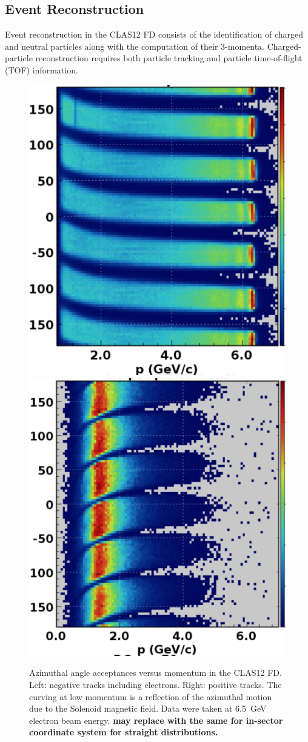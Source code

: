 \documentclass[final,3p,twocolumn]{elsarticle}
\begin{document}
\subsection{Event Reconstruction} 

Event reconstruction in the CLAS12 FD consists of the identification of charged and neutral particles along with the 
computation of their 3-momenta. Charged-particle reconstruction requires both particle tracking and particle 
time-of-flight (TOF) information. 

\begin{figure}[htbp!]
\centerline {
\includegraphics[width=0.5\columnwidth]{neg-tracks.png}
\includegraphics[width=0.52\columnwidth]{pos-tracks.png}}
\caption{Azimuthal angle acceptances versus momentum in the CLAS12 FD. Left: negative tracks including electrons.
Right: positive tracks. The curving at low momentum is a reflection of the azimuthal motion due to the Solenoid magnetic
field. Data were taken at 6.5~GeV electron beam energy. {\bf may replace with the same for in-sector coordinate
system for straight distributions.}} 
\label{neg-pos}
\end{figure}
\end{document}
